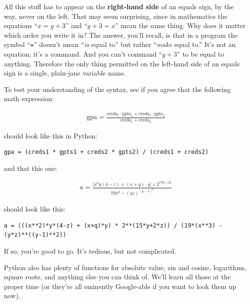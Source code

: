 All this stuff has to appear on the \textbf{right-hand side} of an equals sign,
by the way, never on the left. That may seem surprising, since in mathematics
the equations ``$x = y + 3$'' and ``$y + 3 = x$'' mean the same thing. Why does
it matter which order you write it in? The answer, you'll recall, is that in a
program the symbol ``\texttt{=}'' doesn't mean ``\textit{is} equal to'' but
rather ``\textit{make} equal to.'' It's not an equation; it's a command. And
you can't command ``$y+3$'' to be equal to anything. Therefore the only thing
permitted on the left-hand side of an equals sign is a single, plain-jane
variable name.

To test your understanding of the syntax, see if you agree that the following
math expression:

\begin{align*}
\textrm{gpa} = \frac{
\textrm{creds}_1 \cdot \textrm{gpts}_1 +
\textrm{creds}_2 \cdot \textrm{gpts}_2}
{\textrm{creds}_1 + \textrm{creds}_2}
\end{align*}

should look like this in Python:

\begin{Verbatim}[fontsize=\footnotesize,samepage=true,frame=single,framesep=3mm]
gpa = (creds1 * gpts1 + creds2 * gpts2) / (creds1 + creds2)
\end{Verbatim}

and that this one:

\begin{align*}
a = \frac{\lbrack x^2y(4-z) + (x+q)\cdot y \rbrack \times 2^{15y+2z}}
{19x^3 - (yz)^{(y-1)^2}}
\end{align*}

should look like this:

\begin{Verbatim}[fontsize=\tiny,samepage=true,frame=single,framesep=3mm]
a = (((x**2)*y*(4-z) + (x+q)*y) * 2**(15*y+2*z)) / (19*(x**3) - (y*z)**((y-1)**2))
\end{Verbatim}

\vspace{-.15in}

If so, you're good to go. It's tedious, but not complicated.

Python also has plenty of functions for absolute value, sin and cosine,
logarithms, square roots, and anything else you can think of. We'll learn all
those at the proper time (or they're all eminently Google-able if you want to
look them up now).


